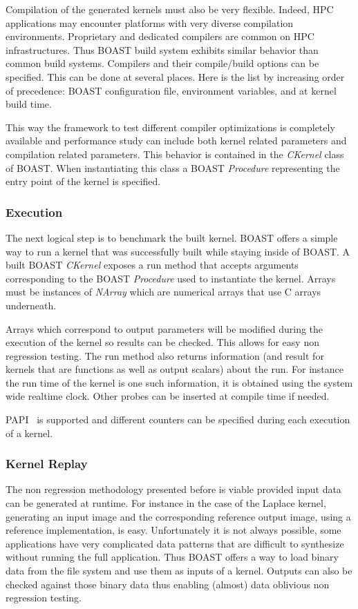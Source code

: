\documentclass[11pt, a4paper, twoside]{montblanc}
\begin{document}
Compilation of the generated kernels must also be very flexible. Indeed, HPC
applications may encounter platforms with very diverse compilation environments.
Proprietary and dedicated compilers are common on HPC infrastructures. Thus
BOAST build system exhibits similar behavior than common build systems. Compilers
and their compile/build options can be specified. This can be done at several
places. Here is the list by increasing order of precedence: BOAST configuration
file, environment variables, and at kernel build time.

This way the framework to test different compiler optimizations is completely
available and performance study can include both kernel related parameters and
compilation related parameters. This behavior is contained in the \emph{CKernel}
class of BOAST. When instantiating this class a BOAST \emph{Procedure}
representing the entry point of the kernel is specified.

  \subsubsection{Execution}

The next logical step is to benchmark the built kernel. BOAST offers a simple
way to run a kernel that was successfully built while staying inside of BOAST.
A built BOAST \emph{CKernel} exposes a run method that accepts arguments corresponding
to the BOAST \emph{Procedure} used to instantiate the kernel. Arrays must be
instances of \emph{NArray} which are numerical arrays that use C arrays
underneath.

Arrays which correspond to output parameters will be modified during the
execution of the kernel so results can be checked. This allows for easy non
regression testing. The run method also returns information (and result for
kernels that are functions as well as output scalars) about the run. For
instance the run time of the kernel is one such information, it is obtained
using the system wide realtime clock. Other probes can be inserted at compile
time if needed.

PAPI~\cite{mucci1999papi} is supported and different counters can be specified
during each execution of a kernel.

  \subsubsection{Kernel Replay}

The non regression methodology presented before is viable provided input data
can be generated at runtime. For instance in the case of the Laplace kernel,
generating an input image and the corresponding reference output image, using a
reference implementation, is easy. Unfortunately it is not always possible, some
applications have very complicated data patterns that are difficult to
synthesize without running the full application. Thus BOAST offers a way to load
binary data from the file system and use them as inputs of a kernel. Outputs can
also be checked against those binary data thus enabling (almost) data oblivious
non regression testing.
\end{document}
